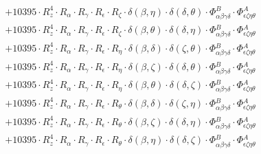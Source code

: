 \documentclass{article}
\begin{document}
\begin{equation}
\begin{array}{c}
 \\[0.2em] 		 + 10395 \cdot R_{z}^{4} \cdot R_{\alpha{}} \cdot R_{\gamma{}} \cdot R_{\epsilon{}} \cdot R_{\zeta{}} \cdot \delta{}\left(\beta{}, \eta{}\right) \cdot \delta{}\left(\delta{}, \theta{}\right) \cdot \Phi{}^{B}_{\alpha{}\beta{}\gamma{}\delta{}} \cdot \Phi{}^{A}_{\epsilon{}\zeta{}\eta{}\theta{}} 
 \\[0.2em] 		 + 10395 \cdot R_{z}^{4} \cdot R_{\alpha{}} \cdot R_{\gamma{}} \cdot R_{\epsilon{}} \cdot R_{\zeta{}} \cdot \delta{}\left(\beta{}, \theta{}\right) \cdot \delta{}\left(\delta{}, \eta{}\right) \cdot \Phi{}^{B}_{\alpha{}\beta{}\gamma{}\delta{}} \cdot \Phi{}^{A}_{\epsilon{}\zeta{}\eta{}\theta{}} 
 \\[0.2em] 		 + 10395 \cdot R_{z}^{4} \cdot R_{\alpha{}} \cdot R_{\gamma{}} \cdot R_{\epsilon{}} \cdot R_{\eta{}} \cdot \delta{}\left(\beta{}, \delta{}\right) \cdot \delta{}\left(\zeta{}, \theta{}\right) \cdot \Phi{}^{B}_{\alpha{}\beta{}\gamma{}\delta{}} \cdot \Phi{}^{A}_{\epsilon{}\zeta{}\eta{}\theta{}} 
 \\[0.2em] 		 + 10395 \cdot R_{z}^{4} \cdot R_{\alpha{}} \cdot R_{\gamma{}} \cdot R_{\epsilon{}} \cdot R_{\eta{}} \cdot \delta{}\left(\beta{}, \zeta{}\right) \cdot \delta{}\left(\delta{}, \theta{}\right) \cdot \Phi{}^{B}_{\alpha{}\beta{}\gamma{}\delta{}} \cdot \Phi{}^{A}_{\epsilon{}\zeta{}\eta{}\theta{}} 
 \\[0.2em] 		 + 10395 \cdot R_{z}^{4} \cdot R_{\alpha{}} \cdot R_{\gamma{}} \cdot R_{\epsilon{}} \cdot R_{\eta{}} \cdot \delta{}\left(\beta{}, \theta{}\right) \cdot \delta{}\left(\delta{}, \zeta{}\right) \cdot \Phi{}^{B}_{\alpha{}\beta{}\gamma{}\delta{}} \cdot \Phi{}^{A}_{\epsilon{}\zeta{}\eta{}\theta{}} 
 \\[0.2em] 		 + 10395 \cdot R_{z}^{4} \cdot R_{\alpha{}} \cdot R_{\gamma{}} \cdot R_{\epsilon{}} \cdot R_{\theta{}} \cdot \delta{}\left(\beta{}, \delta{}\right) \cdot \delta{}\left(\zeta{}, \eta{}\right) \cdot \Phi{}^{B}_{\alpha{}\beta{}\gamma{}\delta{}} \cdot \Phi{}^{A}_{\epsilon{}\zeta{}\eta{}\theta{}} 
 \\[0.2em] 		 + 10395 \cdot R_{z}^{4} \cdot R_{\alpha{}} \cdot R_{\gamma{}} \cdot R_{\epsilon{}} \cdot R_{\theta{}} \cdot \delta{}\left(\beta{}, \zeta{}\right) \cdot \delta{}\left(\delta{}, \eta{}\right) \cdot \Phi{}^{B}_{\alpha{}\beta{}\gamma{}\delta{}} \cdot \Phi{}^{A}_{\epsilon{}\zeta{}\eta{}\theta{}} 
 \\[0.2em] 		 + 10395 \cdot R_{z}^{4} \cdot R_{\alpha{}} \cdot R_{\gamma{}} \cdot R_{\epsilon{}} \cdot R_{\theta{}} \cdot \delta{}\left(\beta{}, \eta{}\right) \cdot \delta{}\left(\delta{}, \zeta{}\right) \cdot \Phi{}^{B}_{\alpha{}\beta{}\gamma{}\delta{}} \cdot \Phi{}^{A}_{\epsilon{}\zeta{}\eta{}\theta{}} 

\end{array}
\end{equation}
\end{document}
